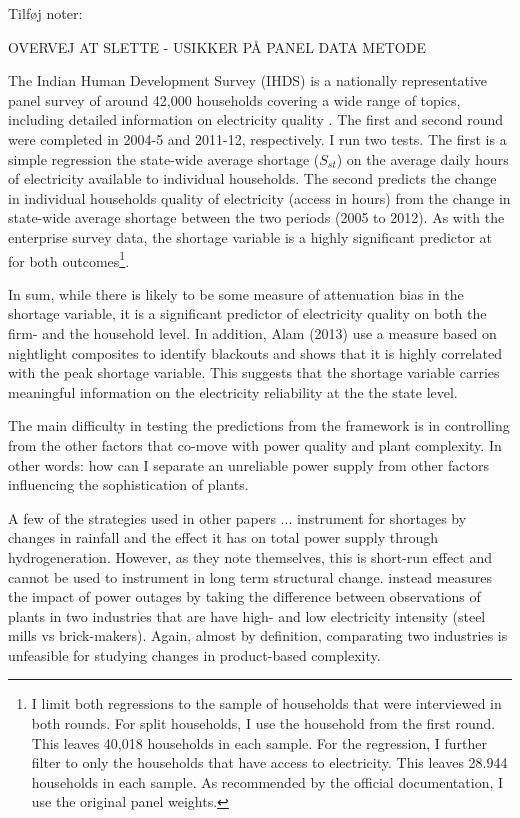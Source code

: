 \documentclass[11pt]{article}
\begin{document}
Tilføj noter: 



% 


% 

OVERVEJ AT SLETTE - USIKKER PÅ PANEL DATA METODE

The Indian Human Development Survey (IHDS) is a nationally representative panel survey of around 42,000 households covering a wide range of topics, including detailed information on electricity quality \citep{desai_india_2018-1,desai_india_2018}. The first and second round were completed in 2004-5 and 2011-12, respectively. I run two tests. The first is a simple regression the state-wide average shortage (\(S_{st}\)) on the average daily hours of electricity available to individual households. The second predicts the change in individual households quality of electricity (access in hours) from the change in state-wide average shortage between the two periods (2005 to 2012). As with the enterprise survey data, the shortage variable is a highly significant predictor at for both outcomes\footnote{I limit both regressions to the sample of households that were interviewed in both rounds. For split households, I use the household from the first round. This leaves 40,018 households in each sample. For the regression, I further filter to only the households that have access to electricity. This leaves 28.944 households in each sample. As recommended by the official documentation, I use the original panel weights.}.

In sum, while there is likely to be some measure of attenuation bias in the shortage variable, it is a significant predictor of electricity quality on both the firm- and the household level. In addition, Alam (2013) use a measure based on nightlight composites to identify blackouts and shows that it is highly correlated with the peak shortage variable. This suggests that the shortage variable carries meaningful information on the electricity reliability at the the state level.

The main difficulty in testing the predictions from the framework is in controlling from the other factors that co-move with power quality and plant complexity. In other words: how can I separate an unreliable power supply from other factors influencing the sophistication of plants. 

A few of the strategies used in other papers ...  \cite{allcott_how_2016} instrument for shortages by changes in rainfall and the effect it has on total power supply through hydrogeneration. However, as they note themselves, this is short-run effect and cannot be used to instrument in long term structural change.  \cite{alam_coping_2013} instead measures the impact of power outages by taking the difference between observations of plants in two industries that are have high- and low electricity intensity (steel mills vs brick-makers). Again, almost by definition, comparating two industries is unfeasible for studying changes in product-based complexity.
\end{document}
